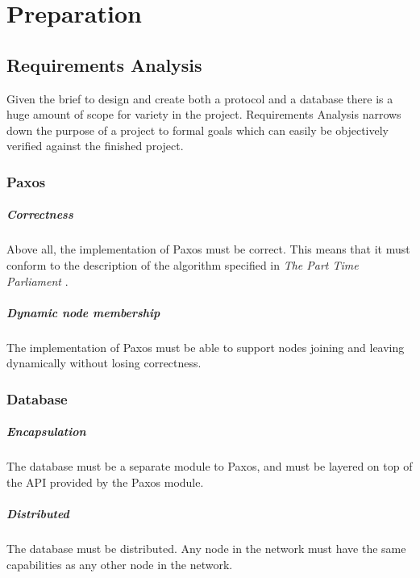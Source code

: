 \documentclass[12pt,twoside,notitlepage]{report}
\begin{document}

\cleardoublepage

\chapter{Preparation}

\section{Requirements Analysis}

Given the brief to design and create both a protocol and a database there is a huge amount of scope for
variety in the project. Requirements Analysis narrows down the purpose of a project to formal
goals which can easily be objectively verified against the finished project.

\subsection*{Paxos}
\paragraph{Correctness} Above all, the implementation of Paxos must be correct. This means that it
must conform to the description of the algorithm specified in \emph{The Part Time Parliament}
\cite{lamport98}.
\paragraph{Dynamic node membership} The implementation of Paxos must be able to support nodes
joining and leaving dynamically without losing correctness.

\subsection*{Database}
\paragraph{Encapsulation} The database must be a separate module to Paxos, and must be layered on
top of the API provided by the Paxos module.
\paragraph{Distributed} The database must be distributed. Any node in the network must have the
same capabilities as any other node in the network.
\end{document}
